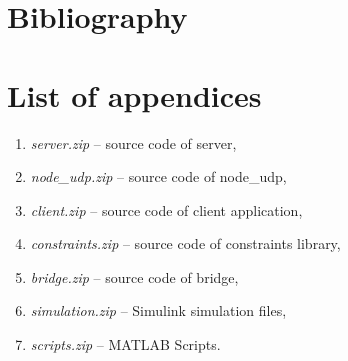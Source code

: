 \chapter{Bibliography}
\printbibliography[heading=none]





\chapter*{List of appendices}

\begin{enumerate}
	\item \textit{server.zip} -- source code of server,
	\item \textit{node\_udp.zip} -- source code of node\_udp,
	\item \textit{client.zip} -- source code of client application,
	\item \textit{constraints.zip} -- source code of constraints library,
	\item \textit{bridge.zip} -- source code of bridge,
	\item \textit{simulation.zip} -- Simulink simulation files,
	\item \textit{scripts.zip} -- MATLAB Scripts.
\end{enumerate}
\thispagestyle{empty}